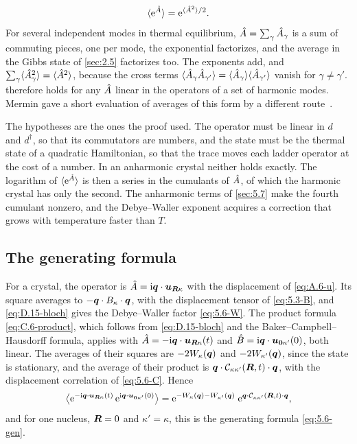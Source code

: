 \begin{equation}
  \langle\mathrm{e}^{\hat{A}}\rangle = \mathrm{e}^{\langle\hat{A}^2\rangle/2} .
  \label{eq:D.15-bloch}
\end{equation}
For several independent modes in thermal equilibrium, $\hat{A} = \sum_\gamma\hat{A}_\gamma$ is a sum of commuting pieces, one per mode, the exponential factorizes, and the average in the Gibbs state of \cref{sec:2.5} factorizes too. The exponents add, and $\sum_\gamma\langle\hat{A}_\gamma^2\rangle = \langle\hat{A}^2\rangle$, because the cross terms $\langle\hat{A}_\gamma\hat{A}_{\gamma'}\rangle = \langle\hat{A}_\gamma\rangle\langle\hat{A}_{\gamma'}\rangle$ vanish for $\gamma \ne \gamma'$.  therefore holds for any $\hat{A}$ linear in the operators of a set of harmonic modes. Mermin gave a short evaluation of averages of this form by a different route~\cite{mermin1966short}.

The hypotheses are the ones the proof used. The operator must be linear in $d$ and $d^\dagger$, so that its commutators are numbers, and the state must be the thermal state of a quadratic Hamiltonian, so that the trace moves each ladder operator at the cost of a number. In an anharmonic crystal neither holds exactly. The logarithm of $\langle\mathrm{e}^{\hat{A}}\rangle$ is then a series in the cumulants of $\hat{A}$, of which the harmonic crystal has only the second. The anharmonic terms of \cref{sec:5.7} make the fourth cumulant nonzero, and the Debye--Waller exponent acquires a correction that grows with temperature faster than $T$.

\subsection*{The generating formula}

For a crystal, the operator is $\hat{A} = \mathrm{i}\bm{q}\cdot\bm{u}_{\bm{R}\kappa}$ with the displacement of \cref{eq:A.6-u}. Its square averages to $-\bm{q}\cdot B_\kappa\cdot\bm{q}$, with the displacement tensor of \cref{eq:5.3-B}, and \cref{eq:D.15-bloch} gives the Debye--Waller factor \cref{eq:5.6-W}. The product formula \cref{eq:C.6-product}, which follows from \cref{eq:D.15-bloch} and the Baker--Campbell--Hausdorff formula, applies with $\hat{A} = -\mathrm{i}\bm{q}\cdot\bm{u}_{\bm{R}\kappa}(t)$ and $\hat{B} = \mathrm{i}\bm{q}\cdot\bm{u}_{\bm{0}\kappa'}(0)$, both linear. The averages of their squares are $-2W_\kappa(\bm{q})$ and $-2W_{\kappa'}(\bm{q})$, since the state is stationary, and the average of their product is $\bm{q}\cdot\mathcal{C}_{\kappa\kappa'}(\bm{R},t)\cdot\bm{q}$, with the displacement correlation of \cref{eq:5.6-C}. Hence
\begin{equation}
  \bigl\langle\mathrm{e}^{-\mathrm{i}\bm{q}\cdot\bm{u}_{\bm{R}\kappa}(t)}\,\mathrm{e}^{\mathrm{i}\bm{q}\cdot\bm{u}_{\bm{0}\kappa'}(0)}\bigr\rangle = \mathrm{e}^{-W_\kappa(\bm{q}) - W_{\kappa'}(\bm{q})}\;\mathrm{e}^{\bm{q}\cdot\mathcal{C}_{\kappa\kappa'}(\bm{R},t)\cdot\bm{q}} ,
  \label{eq:D.15-gen}
\end{equation}
and for one nucleus, $\bm{R} = 0$ and $\kappa' = \kappa$, this is the generating formula \cref{eq:5.6-gen}.
